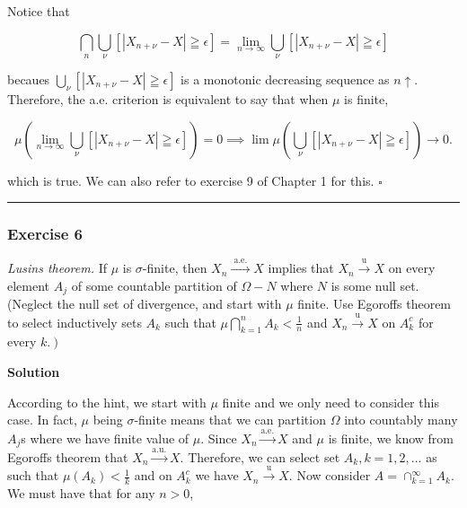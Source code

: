 \documentclass[
]{article}
\begin{document}
Notice that

\[\bigcap_n \bigcup_\nu\left[\left|X_{n+\nu}-X\right| \geqq \epsilon\right] = \lim_{n\to \infty }\bigcup_\nu\left[\left|X_{n+\nu}-X\right| \geqq \epsilon\right]\]

becaues
\(\bigcup_\nu\left[\left|X_{n+\nu}-X\right| \geqq \epsilon\right]\) is a
monotonic decreasing sequence as \(n \uparrow\). Therefore, the a.e.
criterion is equivalent to say that when \(\mu\) is finite,

\[\mu\left(\lim_{n\to \infty} \bigcup_\nu\left[\left|X_{n+\nu}-X\right| \geqq \epsilon\right]\right) = 0 \implies \lim \mu \left(\bigcup_\nu\left[\left|X_{n+\nu}-X\right| \geqq \epsilon\right]\right) \to 0.\]

which is true. We can also refer to exercise 9 of Chapter 1 for this.
\(\square\)

\begin{center}\rule{0.5\linewidth}{0.5pt}\end{center}

\hypertarget{exercise-6-2}{%
  \subsubsection{Exercise 6}\label{exercise-6-2}}

\emph{Lusin\textquotesingle s theorem.} If \(\mu\) is \(\sigma\)-finite,
then \(X_n \stackrel{\text { a.e. }}{\rightarrow} X\) implies that
\(X_n \stackrel{\mathrm{u}}{\rightarrow} X\) on every element \(A_j\) of
some countable partition of \(\Omega-N\) where \(N\) is some null set.
(Neglect the null set of divergence, and start with \(\mu\) finite. Use
Egoroff\textquotesingle s theorem to select inductively sets \(A_k\)
such that \(\mu \bigcap_{k=1}^n A_k<\frac{1}{n}\) and
\(X_n \stackrel{\mathrm{u}}{\rightarrow} X\) on \(A_k^c\) for every
\(\left.k.\right)\)

\textbf{Solution}

According to the hint, we start with \(\mu\) finite and we only need to
consider this case. In fact, \(\mu\) being \(\sigma\)-finite means that
we can partition \(\Omega\) into countably many
\(A_j\)\textquotesingle s where we have finite value of \(\mu\). Since
\(X_n \xrightarrow{\text{a.e.}} X\) and \(\mu\) is finite, we know from
Egoroff\textquotesingle s theorem that
\(X_n\xrightarrow{\text{a.u.}} X\). Therefore, we can select set
\(A_k, k = 1, 2, \dots\) as such that \(\mu(A_k) < \frac{1}{k}\) and on
\(A_k^c\) we have \(X_n \xrightarrow{\text{u}} X\). Now consider
\(A = \cap_{k=1}^\infty A_k\). We must have that for any \(n > 0\),
\end{document}
